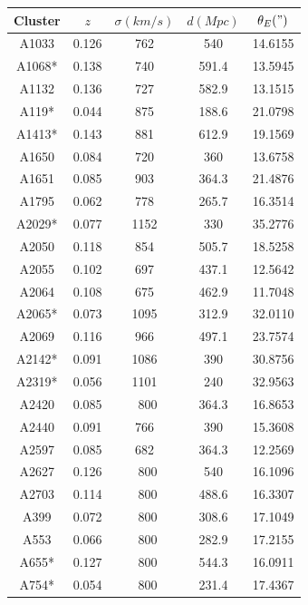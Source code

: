 \begin{table}[H]
\centering

\begin{tabular}{ccccc}
Cluster & $z$   & $\sigma(km/s)$ & $d(Mpc)$ & $\theta_{E}(")$ \\ \hline \hline
A1033   & 0.126 & 762            & 540 & 14.6155  \\
A1068*  & 0.138 & 740            & 591.4 & 13.5945  \\
A1132   & 0.136 & 727            & 582.9 & 13.1515   \\
A119*   & 0.044 & 875            & 188.6 & 21.0798   \\
A1413*  & 0.143 & 881            & 612.9 & 19.1569   \\
A1650   & 0.084 & 720            & 360 & 13.6758   \\
A1651   & 0.085 & 903            & 364.3 & 21.4876   \\
A1795   & 0.062 & 778            & 265.7 & 16.3514   \\
A2029*  & 0.077 & 1152           & 330 & 35.2776   \\
A2050   & 0.118 & 854            & 505.7 & 18.5258   \\
A2055   & 0.102 & 697            & 437.1 & 12.5642   \\
A2064   & 0.108 & 675            & 462.9 & 11.7048   \\
A2065*  & 0.073 & 1095           & 312.9 & 32.0110   \\
A2069   & 0.116 & 966            & 497.1 & 23.7574   \\
A2142*  & 0.091 & 1086           & 390 & 30.8756   \\
A2319*  & 0.056 & 1101           & 240 & 32.9563   \\
A2420   & 0.085 & ~800           & 364.3 & 16.8653   \\
A2440   & 0.091 & 766            & 390 & 15.3608   \\
A2597   & 0.085 & 682            & 364.3 & 12.2569   \\
A2627   & 0.126 & ~800           & 540 & 16.1096   \\
A2703   & 0.114 & ~800           & 488.6 & 16.3307   \\
A399    & 0.072 & ~800           & 308.6 & 17.1049   \\
A553    & 0.066 & ~800           & 282.9 & 17.2155   \\
A655*   & 0.127 & ~800           & 544.3 & 16.0911   \\
A754*   & 0.054 & ~800           & 231.4 & 17.4367   \\

\end{tabular}
\end{table}
